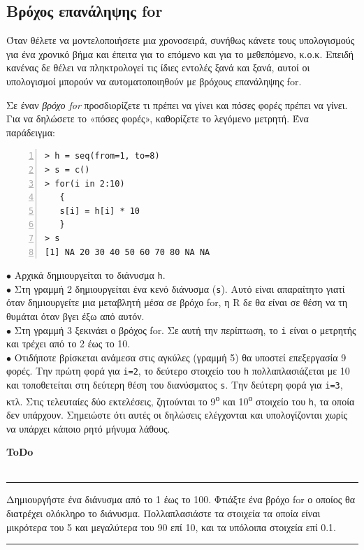 \documentclass[a4paper,10pt,twocolumn]{article}
\newenvironment{ToDo} {
  \begin{flushright}
    \hfill
    \begin{minipage}{0.9\columnwidth}
    \textsf{\textbf{ToDo}} \\
      \vspace{-0.7cm}\\
      {\color{Gray}\rule[-0.05cm]{\columnwidth}{1.5pt}}} {
      {\color{Gray}\rule[0.3cm]{\columnwidth}{1.5pt}}
    \end{minipage}
    \vspace{0.3cm}
  \end{flushright}
  }
\begin{document}
\subsection{Βρόχος επανάληψης for}

Όταν θέλετε να μοντελοποιήσετε μια χρονοσειρά, συνήθως κάνετε τους υπολογισμούς για ένα χρονικό βήμα και έπειτα
για το επόμενο και για το μεθεπόμενο, κ.ο.κ. Επειδή κανένας δε θέλει να πληκτρολογεί τις ίδιες εντολές ξανά
και ξανά, αυτοί οι υπολογισμοί μπορούν να αυτοματοποιηθούν με βρόχους επανάληψης for.

Σε έναν \emph{βρόχο for} προσδιορίζετε τι πρέπει να γίνει και πόσες φορές πρέπει να γίνει. Για να δηλώσετε το 
«πόσες φορές», καθορίζετε το λεγόμενο μετρητή. Ένα παράδειγμα:

\begin{Verbatim}[frame=single,numbers=left,gobble=0, xleftmargin=0.35cm, numbersep=0.1cm]
> h = seq(from=1, to=8)
> s = c()
> for(i in 2:10) 
   {
   s[i] = h[i] * 10
   }
> s
[1] NA 20 30 40 50 60 70 80 NA NA
\end{Verbatim}

\noindent $\bullet$ Αρχικά δημιουργείται το διάνυσμα \texttt{h}.\\
\noindent $\bullet$ Στη γραμμή 2 δημιουργείται ένα κενό διάνυσμα (\texttt{s}). Αυτό είναι απαραίτητο γιατί όταν
δημιουργείτε μια μεταβλητή μέσα σε βρόχο for, η R δε θα είναι σε θέση να τη θυμάται όταν βγει έξω από αυτόν.\\
\noindent $\bullet$  Στη γραμμή 3 ξεκινάει ο βρόχος for. Σε αυτή την περίπτωση, το \texttt{i} είναι ο μετρητής
και τρέχει από το 2 έως το 10.\\
\noindent $\bullet$ Οτιδήποτε βρίσκεται ανάμεσα στις αγκύλες (γραμμή 5) θα υποστεί επεξεργασία 9 φορές. Την
πρώτη φορά για \texttt{i=2}, το δεύτερο στοιχείο του \texttt{h} πολλαπλασιάζεται με 10 και τοποθετείται στη
δεύτερη θέση του διανύσματος \texttt{s}. Την δεύτερη φορά για \texttt{i=3}, κτλ. Στις τελευταίες δύο εκτελέσεις,
ζητούνται το 9\textsuperscript{ο} και 10\textsuperscript{ο} στοιχείο του \texttt{h}, τα οποία δεν υπάρχουν.
Σημειώστε ότι αυτές οι δηλώσεις ελέγχονται και υπολογίζονται χωρίς να υπάρχει κάποιο ρητό μήνυμα λάθους.

\begin{ToDo}
Δημιουργήστε ένα διάνυσμα από το 1 έως το 100. Φτιάξτε ένα βρόχο for ο οποίος θα διατρέχει ολόκληρο το διάνυσμα.
Πολλαπλασιάστε τα στοιχεία τα οποία είναι μικρότερα του 5 και μεγαλύτερα του 90 επί 10, και τα υπόλοιπα στοιχεία
επί 0.1.
\end{ToDo}
\end{document}
